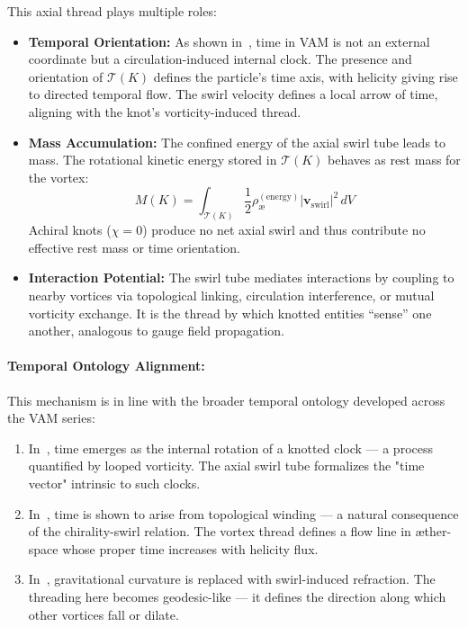 This axial thread plays multiple roles:
\begin{itemize}
    \item \textbf{Temporal Orientation:} As shown in~\cite{VAM2}, time in VAM is not an external coordinate but a circulation-induced internal clock. The presence and orientation of $\mathcal{T}(K)$ defines the particle’s time axis, with helicity giving rise to directed temporal flow. The swirl velocity defines a local arrow of time, aligning with the knot’s vorticity-induced thread.

    \item \textbf{Mass Accumulation:} The confined energy of the axial swirl tube leads to mass. The rotational kinetic energy stored in $\mathcal{T}(K)$ behaves as rest mass for the vortex:
    \begin{equation}
        M(K) = \int_{\mathcal{T}(K)} \frac{1}{2} \rho_{\text{\ae}}^{(\text{energy})} |\mathbf{v}_{\text{swirl}}|^2 \, dV
    \end{equation}
    Achiral knots ($\chi = 0$) produce no net axial swirl and thus contribute no effective rest mass or time orientation.

    \item \textbf{Interaction Potential:} The swirl tube mediates interactions by coupling to nearby vortices via topological linking, circulation interference, or mutual vorticity exchange. It is the thread by which knotted entities “sense” one another, analogous to gauge field propagation.
\end{itemize}

\paragraph{Temporal Ontology Alignment:}
This mechanism is in line with the broader temporal ontology developed across the VAM series:
\begin{enumerate}
    \item In~\cite{VAM2}, time emerges as the internal rotation of a knotted clock --- a process quantified by looped vorticity. The axial swirl tube formalizes the "time vector" intrinsic to such clocks.

    \item In~\cite{VAM13}, time is shown to arise from topological winding --- a natural consequence of the chirality-swirl relation. The vortex thread defines a flow line in æther-space whose proper time increases with helicity flux.

    \item In~\cite{VAM4}, gravitational curvature is replaced with swirl-induced refraction. The threading here becomes geodesic-like --- it defines the direction along which other vortices fall or dilate.
\end{enumerate}

